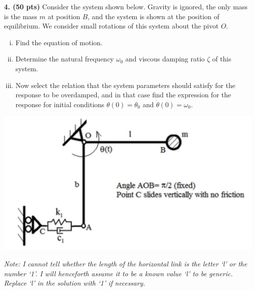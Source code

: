 \begin{problem}
    \textbf{4. (50 pts)} Consider the system shown below. 
    Gravity is ignored, the only mass is the mass $m$ at position $B$, and the system is shown at the position of equilibrium. 
    We consider small rotations of this system about the pivot $O$.
    \begin{enumerate}[(i)]
        \item {
            Find the equation of motion.
        }
        \item {
            Determine the natural frequency $\omega_0$ and viscous damping ratio $\zeta$ of this system.
        }
        \item {
            Now select the relation that the system parameters should satisfy for the response to be overdamped, and in that case find the expression for the response for initial conditions $\theta(0) = \theta_0$ and $\dot{\theta}(0) = \omega_0$.
        }

    \end{enumerate}
    \begin{center}
        \includegraphics[width=0.5\linewidth]{homework/hw1/assets/hw1_p4.png}
    \end{center}
\end{problem}

\noindent\emph{Note: I cannot tell whether the length of the horizontal link is the letter `l' or the number `1'. I will henceforth assume it to be a known value `l' to be generic. Replace `l' in the solution with `1' if necessary. }

